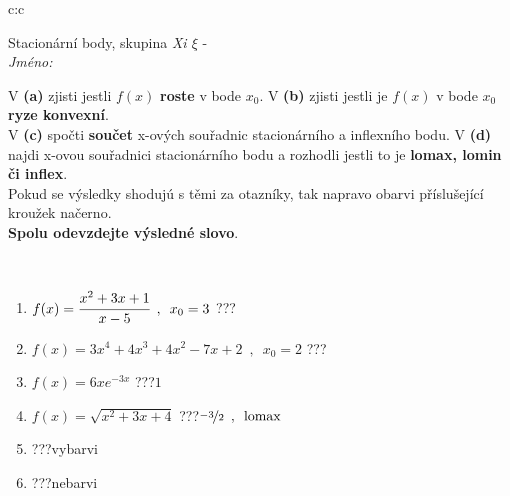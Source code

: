 \documentclass[10pt]{report}
\begin{document}
\newpage
\thispagestyle{empty}
\begin{tabular}{c:c}
\begin{minipage}[c][104.5mm][t]{0.5\linewidth}
\begin{center}
\vspace{7mm}
{\huge Stacionární body, skupina \textit{Xi $\xi$} -}\\[5mm]
\textit{Jméno:}\phantom{xxxxxxxxxxxxxxxxxxxxxxxxxxxxxxxxxxxxxxxxxxxxxxxxxxxxxxxxxxxxxxxxx}\\[5mm]
\begin{minipage}{0.95\linewidth}
\begin{center}
{\small V \textbf{(a)} zjisti jestli $f(x)$ \textbf{roste} v bode $x_0$. V \textbf{(b)} zjisti jestli je $f(x)$ v bode $x_0$ \textbf{ryze konvexní}.\\V \textbf{(c)} spočti \textbf{součet} x-ových souřadnic stacionárního a inflexního bodu. V \textbf{(d)} najdi x-ovou souřadnici stacionárního bodu a rozhodli jestli to je \textbf{lomax, lomin či inflex}.\\Pokud se výsledky shodujú s těmi za otazníky, tak napravo obarvi příslušející kroužek načerno.\\\textbf{Spolu odevzdejte výsledné slovo}}.
\end{center}
\end{minipage}
\\[1mm]
\begin{minipage}{0.79\linewidth}
\begin{center}
\begin{varwidth}{\linewidth}
\begin{enumerate}
\normalsize
\item $f(x)=\cfrac{x^2+3x+1}{x-5}\enspace , \enspace x_0=3$\quad \dotfill\; ???\;\dotfill \quad {}
\item $f(x)=3x^4+4x^3+4x^2-7x+2\enspace , \enspace x_0=2$\quad \dotfill\; ???\;\dotfill \quad {}
\item $f(x)=6xe^{-3x}$\quad \dotfill\; ???\;\dotfill \quad $1$
\item $f(x)=\sqrt{x^2+3x+4}$\quad \dotfill\; ???\;\dotfill \quad $\nicefrac{-3}{2}\enspace , \enspace\mathrm{lomax}$
\item \quad \dotfill\; ???\;\dotfill \quad vybarvi
\item \quad \dotfill\; ???\;\dotfill \quad nebarvi
\end{enumerate}
\end{varwidth}
\end{center}

\end{minipage}
\end{center}
\end{minipage}
\end{tabular}
\end{document}
